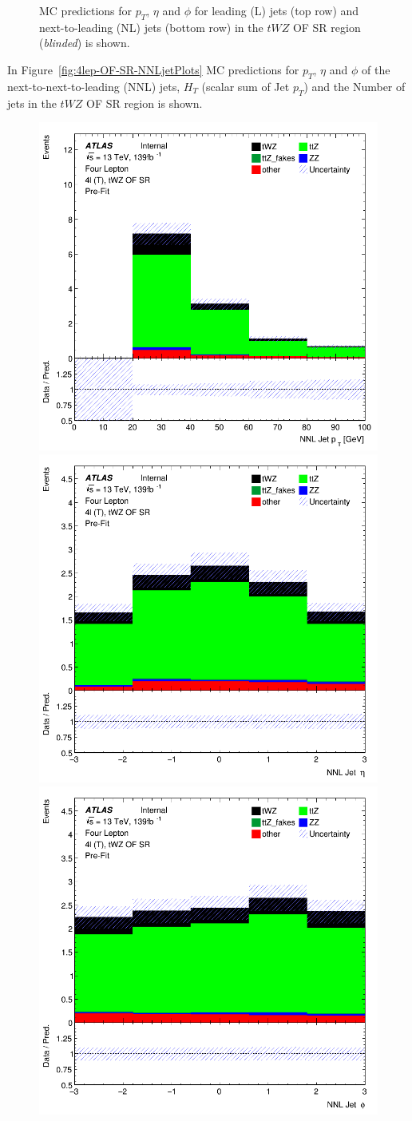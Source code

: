 \begin{figure}[htbp]
\begin{tabular}{ccc}
  \end{tabular}
    \caption{MC predictions for $p_{T}$, $\eta$ and $\phi$ for leading (L) jets (top row) and next-to-leading (NL) jets (bottom row) in the $tWZ$ OF SR region (\textit{blinded}) is shown.}
    \label{fig:4lep-OF-SR-LandNjetPlots} 
\end{figure}

In Figure~\ref{fig:4lep-OF-SR-NNLjetPlots} MC predictions for $p_{T}$, $\eta$ and $\phi$ of the next-to-next-to-leading (NNL) jets, $H_{T}$ (scalar sum of Jet $p_{T}$) and the Number of jets in the $tWZ$ OF SR region is shown.


\begin{figure}[htbp]
 \centering


    \includegraphics[width=.3\textwidth]{figures/PreFitPlots/lep4_tWZ_4T_OF_NNLJet_pt.png} \quad
    \includegraphics[width=.3\textwidth]{figures/PreFitPlots/lep4_tWZ_4T_OF_NNLJet_eta.png} \quad
    \includegraphics[width=.3\textwidth]{figures/PreFitPlots/lep4_tWZ_4T_OF_NNLJet_phi.png}

    \medskip


\end{figure}
